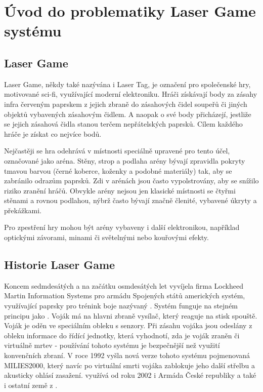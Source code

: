 \chapter{Úvod do problematiky Laser Game systému}

\section{Laser Game}
Laser Game, někdy také nazývána i Laser Tag, je označení pro společenské hry, motivované sci-fi, využívající moderní elektroniku. Hráči získávají body za zásahy infra červeným paprskem z jejich zbraně do zásahových čidel soupeřů či jiných objektů vybavených zásahovým čidlem. A naopak o své body přicházejí, jestliže se jejich zásahová čidla stanou terčem nepřátelských  paprsků. Cílem každého hráče je získat co nejvíce bodů.

Nejčastěji se hra odehrává v místnosti speciálně upravené pro tento účel, označované jako aréna. Stěny, strop a podlaha arény bývají zpravidla pokryty tmavou barvou (černé koberce, koženky a podobné materiály) tak, aby se zabránilo odrazům  paprsků. Zdi v arénách jsou často vypolstrovány, aby se snížilo riziko zranění hráčů. Obvykle arény nejsou jen klasické místnosti se čtyřmi stěnami a rovnou podlahou, nýbrž často bývají značně členité, vybavené úkryty a překážkami.

Pro zpestření hry mohou být arény vybaveny i další elektronikou, například optickými závorami, minami či světelnými nebo kouřovými efekty.

\section{Historie Laser Game}
Koncem sedmdesátých a na začátku osmdesátých let vyvíjela firma Lockheed Martin Information Systems pro armádu Spojených států amerických systém, využívající  paprsky pro trénink boje nazývaný . Systém funguje na stejném principu jako . Voják má na hlavni zbraně  vysílač, který reaguje na stisk spouště. Voják je oděn ve speciálním obleku s  senzory. Při zásahu vojáka jsou odeslány z obleku informace do řídící jednotky, která vyhodnotí, zda je voják zraněn či virtuálně mrtev - používání tohoto systému je bezpečnější než využití konvenčních zbraní. V roce 1992 vyšla nová verze tohoto systému pojmenovaná MILIES2000, který navíc po virtuální smrti vojáka zablokuje jeho další střelbu a akusticky ohlásí zasažení.  využívá od roku 2002 i Armáda České republiky a také i ostatní země z .

